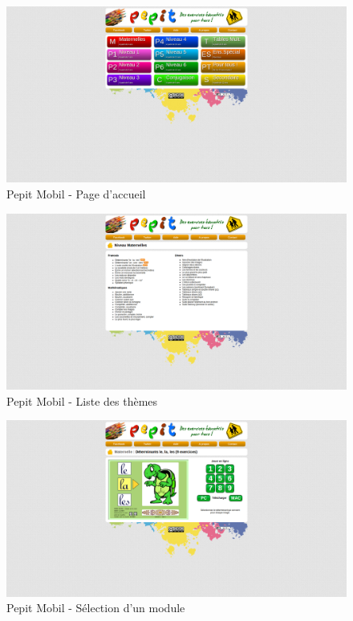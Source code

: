 \begin{figure}[H]
\begin{center}
\includegraphics[width=15cm]{images/pepit_be_homepage}
\end{center}
\caption{Pepit Mobil - Page d'accueil}
\label{Pepit Mobil - Page d'accueil}
\end{figure}

\begin{figure}[H]
\begin{center}
\includegraphics[width=15cm]{images/pepit_be_list}
\end{center}
\caption{Pepit Mobil - Liste des thèmes}
\label{Pepit Mobil - Liste des thèmes}
\end{figure}

\begin{figure}[H]
\begin{center}
\includegraphics[width=15cm]{images/pepit_be_modules}
\end{center}
\caption{Pepit Mobil - Sélection d'un module}
\label{Pepit Mobil - Sélection d'un module}
\end{figure}

